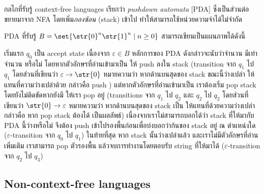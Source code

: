 กลไกที่รับรู้ context-free languages เรียกว่า \emph{pushdown automata} [PDA] ซึ่งเป็นส่วนต่อขยายมาจาก NFA โดยเพิ่ม\emph{กองซ้อน} (stack) เข้าไป ทำให้สามารถใช้หน่วยความจำได้ไม่จำกัด
%
\begin{example}
PDA ที่รับรู้ $B=\set{\str{0}^n\str{1}^n\mid n\geq 0}$ สามารถเขียนเป็นแผนภาพได้ดังนี้
\begin{center}
\end{center}
เริ่มแรก $q_0$ เป็น accept state เนื่องจาก $\varepsilon\in B$ \enskip หลักการของ PDA ดังกล่าวจะนับว่าจำนวน  มีเท่าจำนวน  หรือไม่ โดยหากตัวอักษรที่อ่านเข้ามาเป็น  ให้ push  ลงใน stack (transition จาก $q_1$ ไป $q_1$ โดยส่วนที่เขียนว่า $\varepsilon\to\str{0}$ หมายความว่า หากด้านบนสุดของ stack ขณะนี้ว่างเปล่า ให้แทนที่ความว่างเปล่าด้วย  กล่าวคือ push ) \enskip แต่หากตัวอักษรที่อ่านเข้ามาเป็น  เราต้องเริ่ม pop stack โดยยังไม่ติดขัดหากยังมี  ให้เรา pop อยู่ (transitions จาก $q_1$ ไป $q_2$ และ $q_2$ ไป $q_2$ โดยส่วนที่เขียนว่า $\str{0}\to\varepsilon$ หมายความว่า หากด้านบนสุดของ stack เป็น  ให้แทนที่ด้วยความว่างเปล่า กล่าวคือ หาก pop stack ต้องได้  เป็นผลลัพธ์) \enskip เนื่องจากเราไม่สามารถบอกได้ว่า stack ที่ให้มากับ PDA นี้ว่างหรือไม่ จึงต้อง push \str{\$} เข้าไปรองพื้นก่อนเพื่อบ่งบอกว่าก้นของ stack อยู่ ณ ตำแหน่งใด ($\varepsilon$-transition จาก $q_0$ ไป $q_1$) \enskip ในท้ายที่สุด หาก stack นั้นว่างเปล่าแล้ว และเราไม่มีตัวอักษรที่อ่านเพิ่มเติม เราสามารถ pop ตัวรองพื้น \str{\$} แล้วจบการทำงานโดยตอบรับ string ที่ให้มาได้ ($\varepsilon$-transition จาก $q_2$ ไป $q_3$)
\end{example}

\subsection{Non-context-free languages}

